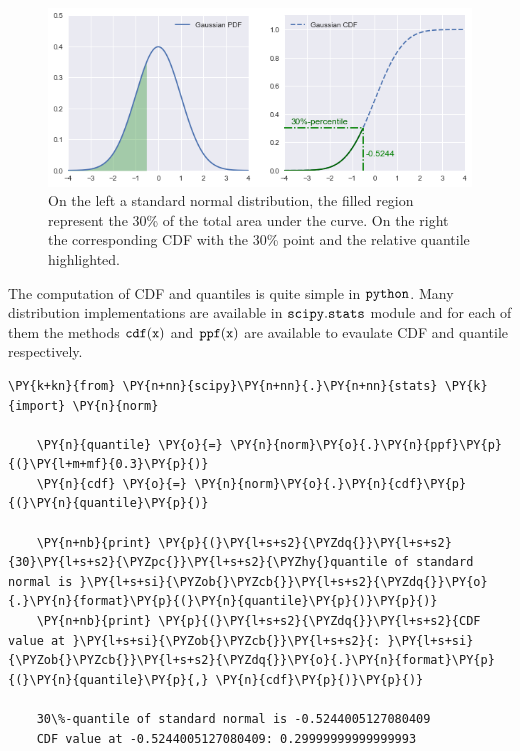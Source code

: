 \begin{figure}[htb]
	\centering
	\includegraphics[width=1.\textwidth]{percentile.png}
	\caption{On the left a standard normal distribution, the filled region represent the 30\% of the total area
		under the curve. On the right the corresponding CDF with the 30\% point and the relative quantile highlighted.}
	\label{fig:percentile}
\end{figure}

The computation of CDF and quantiles is quite simple in \(\tt{python}\).
Many distribution implementations are available in \(\tt{scipy.stats}\)
module and for each of them the methods \(\tt{cdf(x)}\) and
\(\tt{ppf(x)}\) are available to evaulate CDF and quantile respectively.

\begin{tcolorbox}[breakable, size=fbox, boxrule=1pt, pad at break*=1mm,colback=cellbackground, colframe=cellborder]
	\begin{Verbatim}[commandchars=\\\{\}]
	\PY{k+kn}{from} \PY{n+nn}{scipy}\PY{n+nn}{.}\PY{n+nn}{stats} \PY{k}{import} \PY{n}{norm}
	
	\PY{n}{quantile} \PY{o}{=} \PY{n}{norm}\PY{o}{.}\PY{n}{ppf}\PY{p}{(}\PY{l+m+mf}{0.3}\PY{p}{)}
	\PY{n}{cdf} \PY{o}{=} \PY{n}{norm}\PY{o}{.}\PY{n}{cdf}\PY{p}{(}\PY{n}{quantile}\PY{p}{)}
	
	\PY{n+nb}{print} \PY{p}{(}\PY{l+s+s2}{\PYZdq{}}\PY{l+s+s2}{30}\PY{l+s+s2}{\PYZpc{}}\PY{l+s+s2}{\PYZhy{}quantile of standard normal is }\PY{l+s+si}{\PYZob{}\PYZcb{}}\PY{l+s+s2}{\PYZdq{}}\PY{o}{.}\PY{n}{format}\PY{p}{(}\PY{n}{quantile}\PY{p}{)}\PY{p}{)}
	\PY{n+nb}{print} \PY{p}{(}\PY{l+s+s2}{\PYZdq{}}\PY{l+s+s2}{CDF value at }\PY{l+s+si}{\PYZob{}\PYZcb{}}\PY{l+s+s2}{: }\PY{l+s+si}{\PYZob{}\PYZcb{}}\PY{l+s+s2}{\PYZdq{}}\PY{o}{.}\PY{n}{format}\PY{p}{(}\PY{n}{quantile}\PY{p}{,} \PY{n}{cdf}\PY{p}{)}\PY{p}{)}
	
	30\%-quantile of standard normal is -0.5244005127080409
	CDF value at -0.5244005127080409: 0.29999999999999993
	\end{Verbatim}
\end{tcolorbox}


